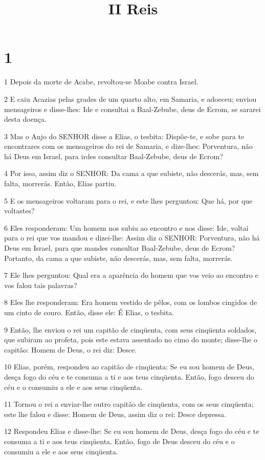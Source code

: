 

\title{II Reis}


\chapter{1}

\par 1 Depois da morte de Acabe, revoltou-se Moabe contra Israel.
\par 2 E caiu Acazias pelas grades de um quarto alto, em Samaria, e adoeceu; enviou mensageiros e disse-lhes: Ide e consultai a Baal-Zebube, deus de Ecrom, se sararei desta doença.
\par 3 Mas o Anjo do SENHOR disse a Elias, o tesbita: Dispõe-te, e sobe para te encontrares com os mensageiros do rei de Samaria, e dize-lhes: Porventura, não há Deus em Israel, para irdes consultar Baal-Zebube, deus de Ecrom?
\par 4 Por isso, assim diz o SENHOR: Da cama a que subiste, não descerás, mas, sem falta, morrerás. Então, Elias partiu.
\par 5 E os mensageiros voltaram para o rei, e este lhes perguntou: Que há, por que voltastes?
\par 6 Eles responderam: Um homem nos subiu ao encontro e nos disse: Ide, voltai para o rei que vos mandou e dizei-lhe: Assim diz o SENHOR: Porventura, não há Deus em Israel, para que mandes consultar Baal-Zebube, deus de Ecrom? Portanto, da cama a que subiste, não descerás, mas, sem falta, morrerás.
\par 7 Ele lhes perguntou: Qual era a aparência do homem que vos veio ao encontro e vos falou tais palavras?
\par 8 Eles lhe responderam: Era homem vestido de pêlos, com os lombos cingidos de um cinto de couro. Então, disse ele: É Elias, o tesbita.
\par 9 Então, lhe enviou o rei um capitão de cinqüenta, com seus cinqüenta soldados, que subiram ao profeta, pois este estava assentado no cimo do monte; disse-lhe o capitão: Homem de Deus, o rei diz: Desce.
\par 10 Elias, porém, respondeu ao capitão de cinqüenta: Se eu sou homem de Deus, desça fogo do céu e te consuma a ti e aos teus cinqüenta. Então, fogo desceu do céu e o consumiu a ele e aos seus cinqüenta.
\par 11 Tornou o rei a enviar-lhe outro capitão de cinqüenta, com os seus cinqüenta; este lhe falou e disse: Homem de Deus, assim diz o rei: Desce depressa.
\par 12 Respondeu Elias e disse-lhe: Se eu sou homem de Deus, desça fogo do céu e te consuma a ti e aos teus cinqüenta. Então, fogo de Deus desceu do céu e o consumiu a ele e aos seus cinqüenta.

